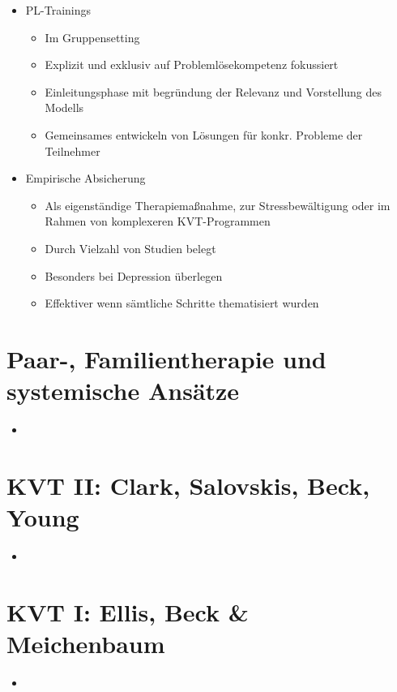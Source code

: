 \documentclass[11pt, paper=a4, twocolumn]{scrartcl}
\begin{document}
\begin{itemize}
\begin{itemize}
				\end{itemize}
			\item PL-Trainings
				\begin{itemize}
					\item Im Gruppensetting 
					\item Explizit und exklusiv auf Problemlösekompetenz fokussiert
					\item Einleitungsphase mit begründung der Relevanz und Vorstellung des Modells
					\item Gemeinsames entwickeln von Lösungen für konkr. Probleme der Teilnehmer
				\end{itemize}
			\item Empirische Absicherung
				\begin{itemize}
					\item Als eigenständige Therapiemaßnahme, zur Stressbewältigung oder im Rahmen von komplexeren KVT-Programmen
					\item Durch Vielzahl von Studien belegt
					\item Besonders bei Depression überlegen
					\item Effektiver wenn sämtliche Schritte thematisiert wurden
				\end{itemize}
		\end{itemize}

	\section{Paar-, Familientherapie und systemische Ansätze}
		\begin{itemize}
			\item 
		\end{itemize}

	\section{KVT II: Clark, Salovskis, Beck, Young}
		\begin{itemize}
			\item 
		\end{itemize}

	\section{KVT I: Ellis, Beck \& Meichenbaum}
		\begin{itemize}
			\item 
		\end{itemize}
\end{document}
